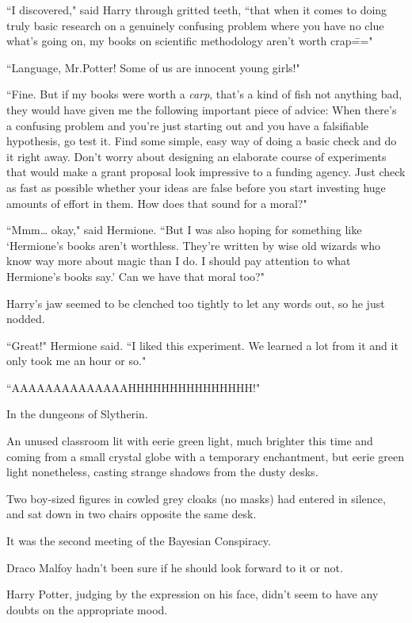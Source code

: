 ``I discovered," said Harry through gritted teeth, ``that when it comes to doing truly basic research on a genuinely confusing problem where you have no clue what's going on, my books on scientific methodology aren't worth crap\==="

``Language, Mr.\?Potter! Some of us are innocent young girls!"

``Fine. But if my books were worth a \emph{carp}, that's a kind of fish not anything bad, they would have given me the following important piece of advice: When there's a confusing problem and you're just starting out and you have a falsifiable hypothesis, go test it. Find some simple, easy way of doing a basic check and do it right away. Don't worry about designing an elaborate course of experiments that would make a grant proposal look impressive to a funding agency. Just check as fast as possible whether your ideas are false before you start investing huge amounts of effort in them. How does that sound for a moral?"

``Mmm{\ldots} okay," said Hermione. ``But I was also hoping for something like `Hermione's books aren't worthless. They're written by wise old wizards who know way more about magic than I do. I should pay attention to what Hermione's books say.' Can we have that moral too?"

Harry's jaw seemed to be clenched too tightly to let any words out, so he just nodded.

``Great!" Hermione said. ``I liked this experiment. We learned a lot from it and it only took me an hour or so."

``AAAAAAAAAAAAAAHHHHHHHHHHHHHHH!"

\later

In the dungeons of Slytherin.

An unused classroom lit with eerie green light, much brighter this time and coming from a small crystal globe with a temporary enchantment, but eerie green light nonetheless, casting strange shadows from the dusty desks.

Two boy-sized figures in cowled grey cloaks (no masks) had entered in silence, and sat down in two chairs opposite the same desk.

It was the second meeting of the Bayesian Conspiracy.

Draco Malfoy hadn't been sure if he should look forward to it or not.

Harry Potter, judging by the expression on his face, didn't seem to have any doubts on the appropriate mood.

